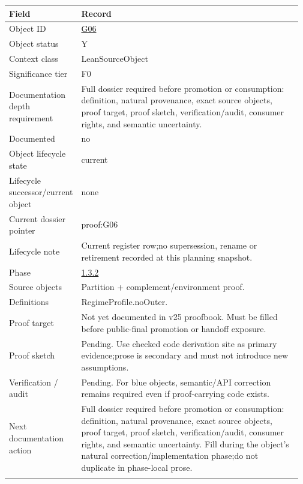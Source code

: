 \begin{longtable}{L{0.16\linewidth} L{0.81\linewidth}}
\hline
\textbf{Field} & \textbf{Record}\\
\hline
Object ID & \hyperlink{object-row-G06}{G06}\\
\hline\addlinespace[0.20em]
Object status & Y\\
\hline\addlinespace[0.20em]
Context class & LeanSourceObject\\
\hline\addlinespace[0.20em]
Significance tier & F0\\
\hline\addlinespace[0.20em]
Documentation depth requirement & Full dossier required before promotion or consumption: definition, natural provenance, exact source objects, proof target, proof sketch, verification/\allowbreak{}audit, consumer rights, and semantic uncertainty.\\
\hline\addlinespace[0.20em]
Documented & no\\
\hline\addlinespace[0.20em]
Object lifecycle state & current\\
\hline\addlinespace[0.20em]
Lifecycle successor/\allowbreak{}current object & none\\
\hline\addlinespace[0.20em]
Current dossier pointer & proof:G06\\
\hline\addlinespace[0.20em]
Lifecycle note & Current register row;\newline no supersession, rename or retirement recorded at this planning snapshot.\\
\hline\addlinespace[0.20em]
Phase & \hyperlink{phase-row-1-3-2}{1.3.2}\\
\hline\addlinespace[0.20em]
Source objects & Partition + complement/\allowbreak{}environment proof.\\
\hline\addlinespace[0.20em]
Definitions & RegimeProfile.noOuter.\\
\hline\addlinespace[0.20em]
Proof target & Not yet documented in v25 proofbook. Must be filled before public-final promotion or handoff exposure.\\
\hline\addlinespace[0.20em]
Proof sketch & Pending. Use checked code derivation site as primary evidence;\newline prose is secondary and must not introduce new assumptions.\\
\hline\addlinespace[0.20em]
Verification /\allowbreak{} audit & Pending. For blue objects, semantic/\allowbreak{}API correction remains required even if proof-carrying code exists.\\
\hline\addlinespace[0.20em]
Next documentation action & Full dossier required before promotion or consumption: definition, natural provenance, exact source objects, proof target, proof sketch, verification/\allowbreak{}audit, consumer rights, and semantic uncertainty. Fill during the object's natural correction/\allowbreak{}implementation phase;\newline do not duplicate in phase-local prose.\\
\hline\addlinespace[0.20em]
\end{longtable}
